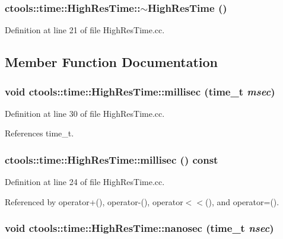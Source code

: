 \subsubsection{\setlength{\rightskip}{0pt plus 5cm}ctools::time::High\-Res\-Time::$\sim${\bf High\-Res\-Time} ()}\label{classctools_1_1time_1_1HighResTime_a3}




Definition at line 21 of file High\-Res\-Time.cc.

\subsection{Member Function Documentation}
\subsubsection{\setlength{\rightskip}{0pt plus 5cm}void ctools::time::High\-Res\-Time::millisec ({\bf time\_\-t} {\em msec})}\label{classctools_1_1time_1_1HighResTime_a5}




Definition at line 30 of file High\-Res\-Time.cc.

References time\_\-t.
\subsubsection{ ctools::time::High\-Res\-Time::millisec () const}\label{classctools_1_1time_1_1HighResTime_a4}




Definition at line 24 of file High\-Res\-Time.cc.

Referenced by operator+(), operator-(), operator$<$$<$(), and operator=().
\subsubsection{\setlength{\rightskip}{0pt plus 5cm}void ctools::time::High\-Res\-Time::nanosec ({\bf time\_\-t} {\em nsec})}\label{classctools_1_1time_1_1HighResTime_a7}




